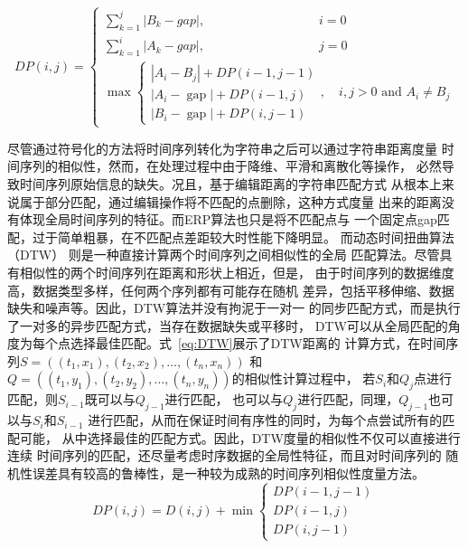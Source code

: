 \begin{equation}
  D P(i, j)= \begin{cases}\sum_{k=1}^{j}\left|B_{k}-g a p\right|, \qquad \qquad \qquad \qquad \quad i=0 \\
    \sum_{k=1}^{i}\left|A_{k}-g a p\right|,\qquad \qquad \qquad \qquad \quad j=0 \\
    \max \left\{\begin{array}{l}
    \left|A_{i}-B_{j}\right|+D P(i-1, j-1) \\
    \left|A_{i}-\operatorname{gap}\right|+D P(i-1, j) \\
    \left|B_{i}-\operatorname{gap}\right|+D P(i, j-1)
    \end{array}, \quad i, j>0 \text { and } A_{i} \neq B_{j}\right.\end{cases}
    \label{eq:ERP}
\end{equation}

尽管通过符号化的方法将时间序列转化为字符串之后可以通过字符串距离度量
时间序列的相似性，然而，在处理过程中由于降维、平滑和离散化等操作，
必然导致时间序列原始信息的缺失。况且，基于编辑距离的字符串匹配方式
从根本上来说属于部分匹配，通过编辑操作将不匹配的点删除，这种方式度量
出来的距离没有体现全局时间序列的特征。而ERP算法也只是将不匹配点与
一个固定点gap匹配，过于简单粗暴，在不匹配点差距较大时性能下降明显。
而动态时间扭曲算法（DTW）\cite{DBLP:conf/kdd/BerndtC94,DBLP:conf/sdm/KeoghP01}
则是一种直接计算两个时间序列之间相似性的全局
匹配算法。尽管具有相似性的两个时间序列在距离和形状上相近，但是，
由于时间序列的数据维度高，数据类型多样，任何两个序列都有可能存在随机
差异，包括平移伸缩、数据缺失和噪声等。因此，DTW算法并没有拘泥于一对一
的同步匹配方式，而是执行了一对多的异步匹配方式，当存在数据缺失或平移时，
DTW可以从全局匹配的角度为每个点选择最佳匹配。式~\ref{eq:DTW}展示了DTW距离的
计算方式，在时间序列$S=((t_1,x_1 ),(t_2,x_2 ),\dots,(t_n,x_n ))$
和$Q=((t_1,y_1 ),(t_2,y_2 ),\dots,(t_n,y_n ))$的相似性计算过程中，
若$S_i$和$Q_j$点进行匹配，则$S_{i-1}$既可以与$Q_{j-1}$进行匹配，
也可以与$Q_j$进行匹配，同理，$Q_{j-1}$也可以与$S_i$和$S_{i-1}$
进行匹配，从而在保证时间有序性的同时，为每个点尝试所有的匹配可能，
从中选择最佳的匹配方式。因此，DTW度量的相似性不仅可以直接进行连续
时间序列的匹配，还尽量考虑时序数据的全局性特征，而且对时间序列的
随机性误差具有较高的鲁棒性，是一种较为成熟的时间序列相似性度量方法。
\begin{equation}
  D P(i, j)=D(i, j)+\min \left\{\begin{array}{c}
    D P(i-1, j-1) \\
    D P(i-1, j) \\
    D P(i, j-1)
    \end{array}\right.
    \label{eq:DTW}
\end{equation}

